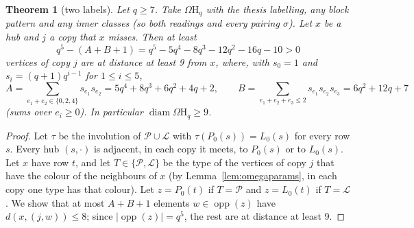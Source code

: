 \documentclass[11pt]{amsart}
\newtheorem{theorem}{Theorem}[section]
\theoremstyle{definition}
\theoremstyle{remark}
\numberwithin{equation}{section}
\newcommand{\diam}{\operatorname{diam}}
\newcommand{\opp}{\operatorname{opp}}
\newcommand{\cL}{\mathcal L}
\newcommand{\cP}{\mathcal P}
\newcommand{\Om}{\Omega\mathrm H}
\begin{document}
\begin{theorem}[two labels]\label{thm:twolabels}
Let $q\ge7$. Take $\Om_q$ with the thesis labelling, any block pattern and any inner classes (so both readings and every
pairing $\sigma$). Let $x$ be a hub and $j$ a copy that $x$ misses. Then at least
\[
q^5-(A+B+1)=q^5-5q^4-8q^3-12q^2-16q-10>0
\]
vertices of copy $j$ are at distance at least 9 from $x$, where, with $s_0=1$ and $s_i=(q+1)q^{i-1}$ for $1\le i\le5$,
\[
A=\sum_{e_1+e_2\in\{0,2,4\}}s_{e_1}s_{e_2}=5q^4+8q^3+6q^2+4q+2,\qquad B=\sum_{e_1+e_2+e_3\le2}s_{e_1}s_{e_2}s_{e_3}=6q^2+12q+7
\]
(sums over $e_i\ge0$). In particular $\diam\Om_q\ge9$.
\end{theorem}

\begin{proof}
Let $\tau$ be the involution of $\cP\cup\cL$ with $\tau(P_0(s))=L_0(s)$ for every row $s$. Every hub $(s,\cdot)$ is adjacent,
in each copy it meets, to $P_0(s)$ or to $L_0(s)$. Let $x$ have row $t$, and let $T\in\{\cP,\cL\}$ be the type of the vertices
of copy $j$ that have the colour of the neighbours of $x$ (by Lemma~\ref{lem:omegaparams}, in each copy one type has that
colour). Let $z=P_0(t)$ if $T=\cP$ and $z=L_0(t)$ if $T=\cL$. We show that at most $A+B+1$ elements $w\in\opp(z)$ have
$d(x,(j,w))\le8$; since $|\opp(z)|=q^5$, the rest are at distance at least 9.


\end{proof}
\end{document}
